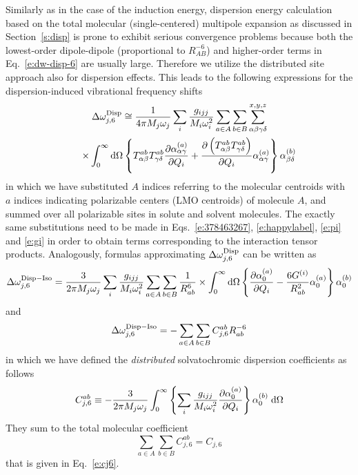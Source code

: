 \documentclass[a4paper,titlepage,twoside,fleqn,12pt]{book}
\begin{document}
\begin{refsection}
Similarly as in the case of the induction energy, 
dispersion energy calculation based on the total molecular (single\hyp{}centered)
multipole expansion as discussed in Section~\ref{s:disp} 
is prone to exhibit serious convergence problems because
both the lowest\hyp{}order 
dipole\hyp{}dipole (proportional to $R^{-6}_{AB}$) 
and higher\hyp{}order terms in Eq.~\eqref{e:dw-disp-6} 
are usually large. Therefore we utilize the distributed site 
approach also for dispersion effects.\citep{Adamovic.Gordon.MolPhys.2005}
This leads to the following expressions for the 
dispersion\hyp{}induced vibrational frequency shifts 
%
\begin{multline}
    \Delta\omega_{j,6}^{\rm Disp} \cong 
       \frac{1}{4\pi M_j\omega_j}\sum_i \frac{g_{ijj}}{M_i\omega_i^2} 
       \sum_{a\in  A}\sum_{b\in B}
       \sum_{\alpha\beta\gamma\delta}^{x,y,z}  \\ 
    \qquad \times \int_{0}^{\infty} {\rm d}\Omega
       \left\{
         T^{ab}_{\alpha\beta}T^{ab}_{\gamma\delta}
           \frac{\partial \alpha_{\alpha\gamma}^{(a)}}{\partial Q_i}
            +
           \frac{\partial \left(T^{ab}_{\alpha\beta}T^{ab}_{\gamma\delta}\right)}{\partial Q_i}
          \alpha_{\alpha\gamma}^{(a)}
      \right\}
      \alpha_{\beta\delta}^{(b)}   
\end{multline}
%
in which we have substituted $A$ indices referring to the molecular centroids
with $a$ indices indicating polarizable centers (LMO centroids) 
of molecule $A$, and summed over all polarizable sites in solute
and solvent molecules. The exactly same substitutions need to be made
in Eqs.~\eqref{e:378463267}, \eqref{e:happylabel}, \eqref{e:pi}  and \eqref{e:gi}
in order to obtain terms corresponding to the interaction tensor products.
Analogously, formulas approximating $\Delta\omega_{j,6}^{\rm Disp}$ 
can be written as
%
\begin{equation} \label{e:dw-disp-6-iso-distributed}
\Delta \omega_{j,6}^{\rm Disp-Iso} = \frac{3}{2\pi M_j\omega_j}
\sum_i \frac{g_{ijj}}{M_i\omega_i^2} 
\sum_{a\in  A}\sum_{b\in B}
\frac{1}{R^6_{ab}} \times
\int_{0}^{\infty} {\rm d}\Omega \left\{ 
\frac{\partial \alpha_0^{(a)}}{\partial Q_i}- 
\frac{6G^{(i)}}{R^2_{ab}} 
\alpha_0^{(a)}
\right\}
\alpha_0^{(b)} 
\end{equation}
%
and 
%
\begin{equation} \label{e:dw-disp-6-iso-approx-distributed}
\Delta \omega_{j,6}^{\rm Disp-Iso} = 
- \sum_{a\in  A}\sum_{b\in B}
C^{ab}_{j,6} R^{-6}_{ab}  
\end{equation}
%
in which we have defined the \emph{distributed} solvatochromic 
dispersion coefficients as follows
%
\begin{equation} \label{e:cj6-distributed}
C^{ab}_{j,6} \equiv -\frac{3}{2\pi M_j\omega_j}
\int_{0}^{\infty} 
\left\{
\sum_i \frac{g_{ijj}}{M_i\omega_i^2} 
\frac{\partial \alpha_0^{(a)}}{\partial Q_i}
\right\}
\alpha_0^{(b)}  \;{\rm d}\Omega  
\end{equation}
%
They sum to the total molecular coefficient
%
\begin{equation}
\sum_{a\in  A}\sum_{b\in B} C^{ab}_{j,6}  =  C_{j,6} 
\end{equation}
%
that is given in Eq.~\eqref{e:cj6}.


\end{refsection}
\end{document}
